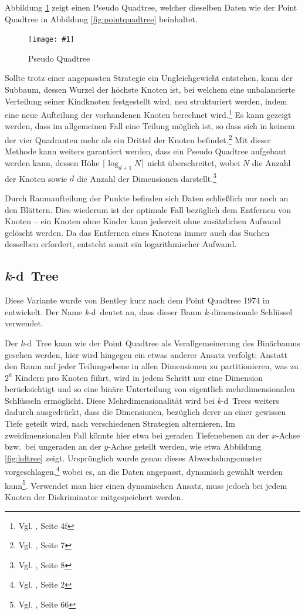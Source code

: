 \documentclass[%
			paper=a4,%
			DIV12,
			liststotoc,
			bibtotoc,
			draft=false,%
			titlepage,
			numbers=noendperiod
			]{scrartcl}
\newcommand{\zit}[3]{#1 \cite{#2}, #3}
\newcommand{\footzit}[3]{\footnote{\zit{#1}{#2}{#3}}}
\newcommand{\kd}{\mbox{\textit{k}-d}}
\newcommand{\myfig}[5] {
 \begin{figure}[tbph]
	 \centering
	 \texttt{[image: \#1]}
	 \caption[#4]{#5}
	 \label{fig:#2}
 \end{figure}
}
\begin{document}
Abbildung \ref{fig:pseudoquadtree} zeigt einen Pseudo Quadtree, welcher dieselben Daten wie der Point Quadtree in Abbildung \ref{fig:pointquadtree} beinhaltet.
\myfig{img/pseudoquadtree-ins3-trimmed}{pseudoquadtree}{width=.6\textwidth}{Pseudo Quadtree}{Pseudo Quadtree}

Sollte trotz einer angepassten Strategie ein Ungleichgewicht entstehen, kann der Subbaum, dessen Wurzel der höchste Knoten ist, bei welchem eine unbalancierte Verteilung seiner Kindknoten festgestellt wird, neu strukturiert werden, indem eine neue Aufteilung der vorhandenen Knoten berechnet wird.\footzit{Vgl.}{DBLP:journals/acta/OvermarsL82}{Seite 4f} %
Es kann gezeigt werden, dass im allgemeinen Fall eine Teilung möglich ist,
so dass sich in keinem der vier Quadranten mehr als ein Drittel der Knoten befindet.\footzit{Vgl.}{DBLP:journals/acta/OvermarsL82}{Seite 7} %
Mit dieser Methode kann weiters garantiert werden, dass ein Pseudo Quadtree aufgebaut werden kann, dessen Höhe $\lceil \log_{d+1} N\rceil$ nicht überschreitet, wobei $N$ die Anzahl der Knoten sowie $d$ die Anzahl der Dimensionen darstellt.\footzit{Vgl.}{DBLP:journals/acta/OvermarsL82}{Seite 8}

Durch Raumaufteilung der Punkte befinden sich Daten schließlich nur noch an den Blättern. Dies wiederum ist der optimale Fall bezüglich dem Entfernen von Knoten -- ein Knoten ohne Kinder kann jederzeit ohne zusätzlichen Aufwand gelöscht werden. Da das Entfernen eines Knotens immer auch das Suchen desselben erfordert, entsteht somit ein logarithmischer Aufwand.


\subsection{\kd\ Tree}
Diese Variante wurde von Bentley kurz nach dem Point Quadtree 1974 in \cite{Bentley:1975} entwickelt. Der Name \kd\ deutet an, dass dieser Baum $k$-dimensionale Schlüssel verwendet. 

Der \kd\ Tree kann wie der Point Quadtree als Verallgemeinerung des Binärbaums gesehen werden, hier wird hingegen ein etwas anderer Ansatz verfolgt:
Anstatt den Raum auf jeder Teilungsebene in allen Dimensionen zu partitionieren, was zu $2^k$ Kindern pro Knoten führt, wird in jedem Schritt nur eine Dimension berücksichtigt und so eine binäre Unterteilung von eigentlich mehrdimensionalen Schlüsseln ermöglicht.
Diese Mehrdimensionalität wird bei \kd\ Trees weiters dadurch ausgedrückt, dass die Dimensionen, bezüglich derer an einer gewissen Tiefe geteilt wird, nach verschiedenen Strategien alternieren.
Im zweidimensionalen Fall könnte hier etwa bei geraden Tiefenebenen an der $x$-Achse bzw.\ bei ungeraden an der $y$-Achse geteilt werden, wie etwa Abbildung \ref{fig:kdtree} zeigt.
Ursprünglich wurde genau dieses Abwechslungsmuster vorgeschlagen,\footzit{Vgl.}{Bentley:1975}{Seite 2}
wobei es, an die Daten angepasst, dynamisch gewählt werden kann\footzit{Vgl.}{Samet90}{Seite 66}.
Verwendet man hier einen dynamischen Ansatz, muss jedoch bei jedem Knoten der Diskriminator mitgespeichert werden.
\end{document}
